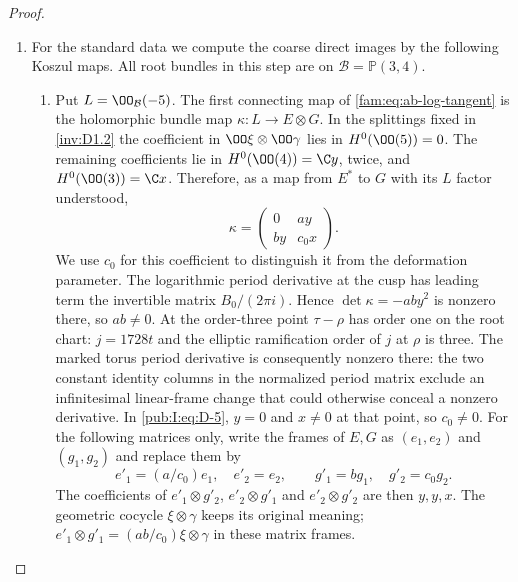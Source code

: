 \begin{proof}
\begin{enumerate}[label=\arabic*.,leftmargin=*]
\item For the standard data we compute the coarse direct images
by the following Koszul maps. All root bundles in this step are on
$\mathcal B=\mathbb P(3,4)$.
\begin{enumerate}[label=(\alph*),leftmargin=*]
\item Put $L=\OO_{\mathcal B}(-5)$. The first connecting map of \eqref{fam:eq:ab-log-tangent} is
the holomorphic bundle map
$\kappa:L\to E\otimes G$. In the splittings fixed in \ref{inv:D1.2} the
coefficient in $\OO\xi\otimes\OO\gamma$ lies in $H^0(\OO(5))=0$.
The remaining coefficients lie in
$H^0(\OO(4))=\C y$, twice, and $H^0(\OO(3))=\C x$.
Therefore, as a map from $E^*$ to $G$ with its $L$ factor understood,
\begin{equation}
 \kappa=\begin{pmatrix}0&a y\\ b y&c_0x\end{pmatrix}.
\label{pub:I:eq:D-5}
\end{equation}
We use $c_0$ for this coefficient to distinguish it from the deformation
parameter. The logarithmic period derivative at the cusp has leading
term the invertible matrix $B_0/(2\pi i)$. Hence
$\det\kappa=-ab y^2$ is nonzero there, so $ab\ne0$.
At the order-three point $\tau-\rho$ has order one on the root chart:
$j=1728t$ and the elliptic ramification order of $j$ at $\rho$ is
three. The marked torus period derivative is consequently nonzero
there: the two constant identity columns in the normalized period
matrix exclude an infinitesimal linear-frame change that could
otherwise conceal a nonzero derivative. In \eqref{pub:I:eq:D-5}, $y=0$ and
$x\ne0$ at that point, so $c_0\ne0$.
For the following matrices only, write the frames of $E,G$ as
$(e_1,e_2)$ and $(g_1,g_2)$ and replace them by
\[
 e'_1=(a/c_0)e_1,\quad e'_2=e_2,\qquad
 g'_1=b g_1,\quad g'_2=c_0g_2.
\]
The coefficients of $e'_1\otimes g'_2$, $e'_2\otimes g'_1$ and
$e'_2\otimes g'_2$ are then $y,y,x$.
The geometric cocycle $\xi\otimes\gamma$ keeps its original
meaning; $e'_1\otimes g'_1=(ab/c_0)\xi\otimes\gamma$ in these
matrix frames.


\end{enumerate}
\end{enumerate}
\end{proof}
